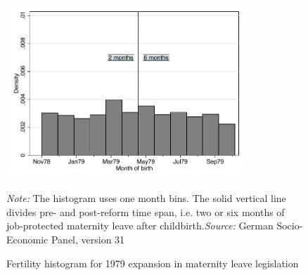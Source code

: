 \documentclass[a4paper ]{article}
\begin{document}
\bigskip
\begin{figure}[h]
\centering
\includegraphics[width=0.8\textwidth]{../../analysis/graphs/SOEP/fertilityhist.pdf}
\caption{Fertility histogram for 1979 expansion in maternity leave legislation}\label{fig: fertilityhist_treated}
\begin{minipage}{\textwidth} %
{\footnotesize \textit{Note:} The histogram uses one month bins. The solid vertical line divides pre- and post-reform time span, i.e. two or six months of job-protected maternity leave after childbirth.\newline \textit{Source: }German Socio-Economic Panel, version 31\par}
\end{minipage}
\end{figure}
\end{document}
